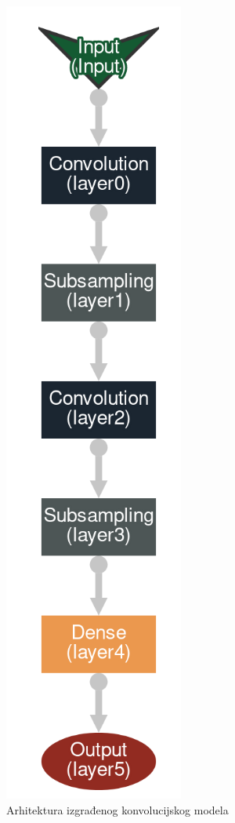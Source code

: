 \documentclass[times, utf8, diplomski]{fer}
\theoremstyle{definition}
\begin{document}
\begin{figure}[h]
\centering
\includegraphics[scale=0.4]{arhitektura_neuronske_mreze.png}
\caption{Arhitektura izgrađenog konvolucijskog modela}
\label{fig:arhitecture}
\end{figure}
\end{document}

